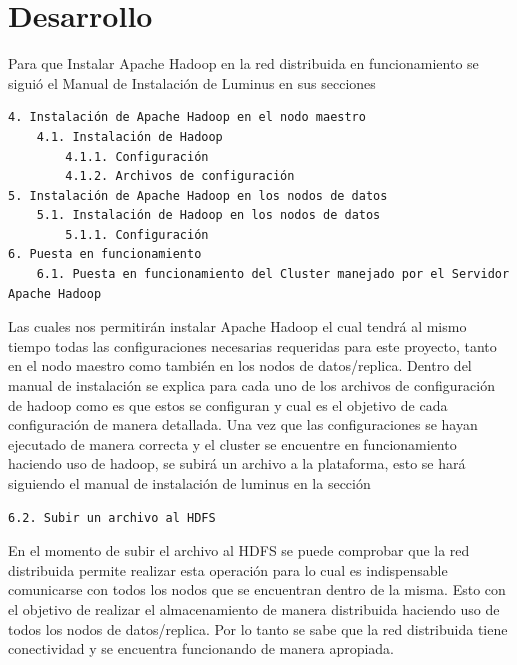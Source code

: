 \section{Desarrollo}
Para que Instalar Apache Hadoop en la red distribuida en funcionamiento se siguió el Manual de Instalación de Luminus 
en sus secciones 
\begin{verbatim}
4. Instalación de Apache Hadoop en el nodo maestro
	4.1. Instalación de Hadoop 
		4.1.1. Configuración
		4.1.2. Archivos de configuración
5. Instalación de Apache Hadoop en los nodos de datos
	5.1. Instalación de Hadoop en los nodos de datos 
		5.1.1. Configuración 
6. Puesta en funcionamiento
	6.1. Puesta en funcionamiento del Cluster manejado por el Servidor Apache Hadoop
\end{verbatim}
Las cuales nos permitirán instalar Apache Hadoop el cual tendrá al mismo tiempo todas las configuraciones necesarias
requeridas para este proyecto, tanto en el nodo maestro como también en los nodos de datos/replica.
Dentro del manual de instalación se explica para cada uno de los archivos de configuración de hadoop como es que
estos se configuran y cual es el objetivo de cada configuración de manera detallada.
Una vez que las configuraciones se hayan ejecutado de manera correcta y el cluster se encuentre en funcionamiento
haciendo uso de hadoop, se subirá un archivo a la plataforma, esto se hará siguiendo el manual de instalación de luminus
en la sección
\begin{verbatim}
6.2. Subir un archivo al HDFS
\end{verbatim}
En el momento de subir el archivo al HDFS se puede comprobar que la red distribuida permite realizar esta operación
para lo cual es indispensable comunicarse con todos los nodos que se encuentran dentro de la misma. Esto con el
objetivo de realizar el almacenamiento de manera distribuida haciendo uso de todos los nodos de datos/replica. Por lo
tanto se sabe que la red distribuida tiene conectividad y se encuentra funcionando de manera apropiada.
